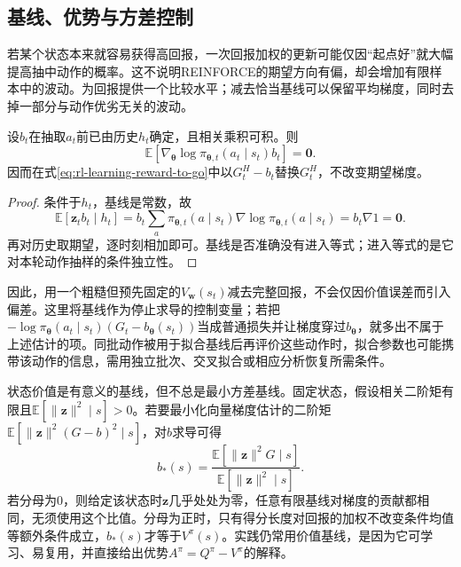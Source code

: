 \subsection{基线、优势与方差控制}
\label{sec:rl-learning-baseline}

若某个状态本来就容易获得高回报，一次回报加权的更新可能仅因“起点好”就大幅提高抽中动作的概率。这不说明REINFORCE的期望方向有偏，却会增加有限样本中的波动。为回报提供一个比较水平；减去恰当基线可以保留平均梯度，同时去掉一部分与动作优劣无关的波动。

\begin{theorem}[动作抽样前基线的零均值性质]
  \label{thm:rl-learning-baseline}
  设$b_t$在抽取$a_t$前已由历史$h_t$确定，且相关乘积可积。则
  \[
    \mathbb E[\nabla_{\bm\theta}
       \log\pi_{\bm\theta,t}(a_t\mid s_t)b_t]=\bm0.
  \]
  因而在式\eqref{eq:rl-learning-reward-to-go}中以$G_t^H-b_t$替换$G_t^H$，不改变期望梯度。
\end{theorem}
\begin{proof}
  条件于$h_t$，基线是常数，故
  \[
    \mathbb E[\bm{z}_t b_t\mid h_t]
      =b_t\sum_a\pi_{\bm\theta,t}(a\mid s_t)
                    \nabla\log\pi_{\bm\theta,t}(a\mid s_t)
      =b_t\nabla 1=\bm0.
  \]
  再对历史取期望，逐时刻相加即可。基线是否准确没有进入等式；进入等式的是它对本轮动作抽样的条件独立性。
\end{proof}

因此，用一个粗糙但预先固定的$V_{\bm w}(s_t)$减去完整回报，不会仅因价值误差而引入偏差。这里将基线作为停止求导的控制变量；若把$-\log\pi_{\bm\theta}(a_t\mid s_t)(G_t-b_{\bm\theta}(s_t))$当成普通损失并让梯度穿过$b_{\bm\theta}$，就多出不属于上述估计的项。同批动作被用于拟合基线后再评价这些动作时，拟合参数也可能携带该动作的信息，需用独立批次、交叉拟合或相应分析恢复所需条件。

状态价值是有意义的基线，但不总是最小方差基线。固定状态，假设相关二阶矩有限且$\mathbb E[\lVert\bm z\rVert^2\mid s]>0$。若要最小化向量梯度估计的二阶矩
$\mathbb E[\lVert\bm z\rVert^2(G-b)^2\mid s]$，对$b$求导可得
\[
  b_*(s)=
    \frac{\mathbb E[\lVert\bm z\rVert^2G\mid s]}
         {\mathbb E[\lVert\bm z\rVert^2\mid s]}.
\]
若分母为0，则给定该状态时$\bm z$几乎处处为零，任意有限基线对梯度的贡献都相同，无须使用这个比值。分母为正时，只有得分长度对回报的加权不改变条件均值等额外条件成立，$b_*(s)$才等于$V^\pi(s)$。实践仍常用价值基线，是因为它可学习、易复用，并直接给出优势$A^\pi=Q^\pi-V^\pi$的解释。


